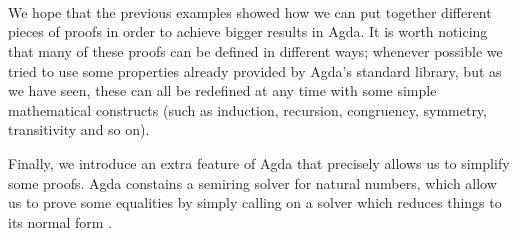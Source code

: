 {\begin{code}
\>[28][@{}l@{\AgdaIndent{0}}]%
\>[30]\AgdaSymbol{(}\AgdaSpace{}%
\AgdaSymbol{((}\AgdaSpace{}%
\AgdaOperator{\AgdaInductiveConstructor{,}}\AgdaSpace{}%
\AgdaSpace{}%
\AgdaSpace{}%
\AgdaSymbol{)}\AgdaSpace{}%
\AgdaSpace{}%
\AgdaSymbol{))}\<%
\\
%
\>[30]\AgdaSymbol{(}\AgdaSpace{}%
\AgdaSymbol{((}\AgdaSpace{}%
\AgdaOperator{\AgdaInductiveConstructor{,}}\AgdaSpace{}%
\AgdaSpace{}%
\AgdaSpace{}%
\AgdaSymbol{)}\AgdaSpace{}%
\AgdaSpace{}%
\AgdaSymbol{))}\<%
\\
%
\>[28]\AgdaSymbol{)}\<%
\\
\>[0]\<%
\end{code}

We hope that the previous examples showed how we can put together different pieces of proofs in order to achieve bigger results in Agda. It is worth noticing that many of these proofs can be defined in different ways; whenever possible we tried to use some properties already provided by Agda's standard library, but as we have seen, these can all be redefined at any time with some simple mathematical constructs (such as induction, recursion, congruency, symmetry, transitivity and so on).

Finally, we introduce an extra feature of Agda that precisely allows us to simplify some proofs. Agda constains a semiring solver for natural numbers, which allow us to prove some equalities by simply calling on a solver which reduces things to its normal form \cite{Unknown2018UsingHttps://wiki.portal.chalmers.se/agda/22n=Libraries.UsingTheRingSolver}.

\begin{code}%
\>[0]\AgdaSpace{}%
\<%
\\
\>[0]\AgdaSpace{}%
\<%
\\
\>[0][@{}l@{\AgdaIndent{0}}]%
\>[2]\AgdaSpace{}%
\AgdaSymbol{(}\AgdaSymbol{;}\AgdaSpace{}%
\AgdaSymbol{;}\AgdaSpace{}%
\AgdaOperator{\AgdaFunction{\AgdaUnderscore{}:=\AgdaUnderscore{}}}\AgdaSymbol{;}\AgdaSpace{}%
\AgdaSymbol{;}\AgdaSpace{}%
\AgdaSymbol{;}\AgdaSpace{}%
\AgdaOperator{\AgdaFunction{\AgdaUnderscore{}:+\AgdaUnderscore{}}}\AgdaSymbol{;}\AgdaSpace{}%
\AgdaOperator{\AgdaFunction{\AgdaUnderscore{}:*\AgdaUnderscore{}}}\AgdaSymbol{;}\AgdaSpace{}%
\AgdaOperator{\AgdaInductiveConstructor{:-\AgdaUnderscore{}}}\AgdaSymbol{;}\AgdaSpace{}%
\AgdaOperator{\AgdaFunction{\AgdaUnderscore{}:-\AgdaUnderscore{}}}\AgdaSymbol{)}\<%
\end{code}

}
